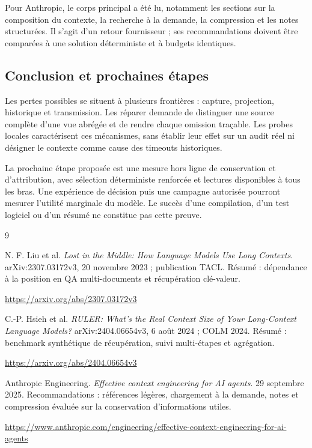 \documentclass[11pt,a4paper]{article}
\begin{document}
Pour Anthropic, le corps principal a été lu, notamment les sections sur la composition du contexte, la recherche à la demande, la compression et les notes structurées. Il s'agit d'un retour fournisseur ; ses recommandations doivent être comparées à une solution déterministe et à budgets identiques.

\begin{samepage}
\section{Conclusion et prochaines étapes}
Les pertes possibles se situent à plusieurs frontières : capture, projection,
historique et transmission. Les réparer demande de distinguer une source
complète d'une vue abrégée et de rendre chaque omission traçable.
Les probes locales caractérisent ces mécanismes, sans établir leur effet sur
un audit réel ni désigner le contexte comme cause des timeouts historiques.

La prochaine étape proposée est une mesure hors ligne de conservation et
d'attribution, avec sélection déterministe renforcée et lectures disponibles
à tous les bras. Une expérience de décision puis une campagne autorisée
pourront mesurer l'utilité marginale du modèle. Le succès d'une compilation,
d'un test logiciel ou d'un résumé ne constitue pas cette preuve.

\par\end{samepage}
\begin{thebibliography}{9}

\small
{} N. F. Liu et al. \emph{Lost in the Middle: How Language Models Use Long Contexts}. arXiv:2307.03172v3, 20 novembre 2023 ; publication TACL. Résumé : dépendance à la position en QA multi-documents et récupération clé-valeur.\par
\url{https://arxiv.org/abs/2307.03172v3}

 C.-P. Hsieh et al. \emph{RULER: What's the Real Context Size of Your Long-Context Language Models?} arXiv:2404.06654v3, 6 août 2024 ; COLM 2024. Résumé : benchmark synthétique de récupération, suivi multi-étapes et agrégation.\par
\url{https://arxiv.org/abs/2404.06654v3}

 Anthropic Engineering. \emph{Effective context engineering for AI agents}. 29 septembre 2025. Recommandations : références légères, chargement à la demande, notes et compression évaluée sur la conservation d'informations utiles.\par
\url{https://www.anthropic.com/engineering/effective-context-engineering-for-ai-agents}
\end{thebibliography}
\end{document}
